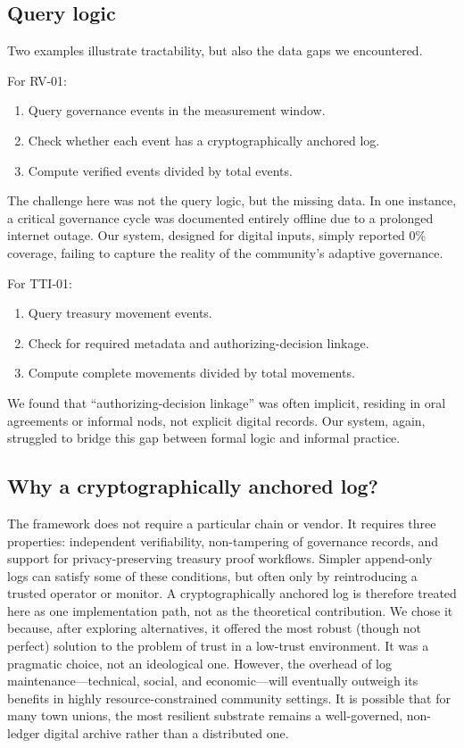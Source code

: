 \documentclass[sigconf,anonymous]{acmart}
\begin{document}
\subsection{Query logic}

Two examples illustrate tractability, but also the data gaps we encountered.

For RV-01:
\begin{enumerate}
\item Query governance events in the measurement window.
\item Check whether each event has a cryptographically anchored log.
\item Compute verified events divided by total events.
\end{enumerate}

The challenge here was not the query logic, but the missing data. In one instance, a critical governance cycle was documented entirely offline due to a prolonged internet outage. Our system, designed for digital inputs, simply reported 0\% coverage, failing to capture the reality of the community’s adaptive governance.

For TTI-01:
\begin{enumerate}
\item Query treasury movement events.
\item Check for required metadata and authorizing-decision linkage.
\item Compute complete movements divided by total movements.
\end{enumerate}

We found that “authorizing-decision linkage” was often implicit, residing in oral agreements or informal nods, not explicit digital records. Our system, again, struggled to bridge this gap between formal logic and informal practice.

\subsection{Why a cryptographically anchored log?}

The framework does not require a particular chain or vendor. It requires three properties: independent verifiability, non-tampering of governance records, and support for privacy-preserving treasury proof workflows. Simpler append-only logs can satisfy some of these conditions, but often only by reintroducing a trusted operator or monitor. A cryptographically anchored log is therefore treated here as one implementation path, not as the theoretical contribution. We chose it because, after exploring alternatives, it offered the most robust (though not perfect) solution to the problem of trust in a low-trust environment. It was a pragmatic choice, not an ideological one. However, the overhead of log maintenance—technical, social, and economic—will eventually outweigh its benefits in highly resource-constrained community settings. It is possible that for many town unions, the most resilient substrate remains a well-governed, non-ledger digital archive rather than a distributed one.
\end{document}
